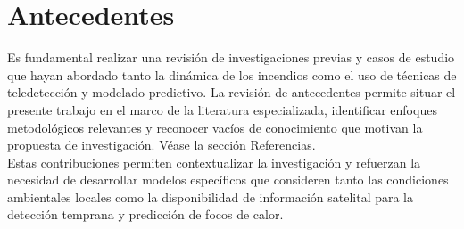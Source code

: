 \section{Antecedentes}
Es fundamental realizar una revisión de investigaciones previas y casos de estudio que hayan abordado tanto la dinámica de los incendios como el uso de técnicas de teledetección y modelado predictivo. La revisión de antecedentes permite situar el presente trabajo en el marco de la literatura especializada, identificar enfoques metodológicos relevantes y reconocer vacíos de conocimiento que motivan la propuesta de investigación. Véase la sección \hyperref[sec:refs]{Referencias}. \\

Estas contribuciones permiten contextualizar la investigación y refuerzan la necesidad de desarrollar modelos específicos que consideren tanto las condiciones ambientales locales como la disponibilidad de información satelital para la detección temprana y predicción de focos de calor.